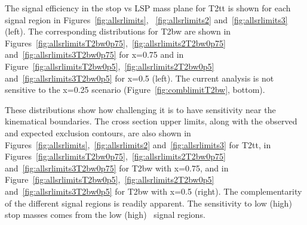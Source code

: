 
The signal efficiency in the stop vs LSP mass plane for T2tt is shown 
for each signal region in Figures~\ref{fig:allsrlimits},
~\ref{fig:allsrlimits2} and~\ref{fig:allsrlimits3} (left). The
corresponding distributions for T2bw are shown in 
Figures~\ref{fig:allsrlimitsT2bw0p75},~\ref{fig:allsrlimits2T2bw0p75}
and~\ref{fig:allsrlimits3T2bw0p75} for x=0.75 and in Figure~\ref{fig:allsrlimitsT2bw0p5},~\ref{fig:allsrlimits2T2bw0p5} and~\ref{fig:allsrlimits3T2bw0p5}
for x=0.5 (left). The current analysis is not sensitive to the x=0.25
scenario (Figure~\ref{fig:comblimitT2bw}, bottom).

These distributions show how
challenging it is to have sensitivity near the kinematical boundaries.
The cross section upper limits, along with the
observed and expected exclusion contours, are also shown in
Figures~\ref{fig:allsrlimits},~\ref{fig:allsrlimits2}
and~\ref{fig:allsrlimits3} for T2tt, in Figures~\ref{fig:allsrlimitsT2bw0p75},~\ref{fig:allsrlimits2T2bw0p75} and~\ref{fig:allsrlimits3T2bw0p75}
for T2bw with x=0.75, and in Figure~\ref{fig:allsrlimitsT2bw0p5},~\ref{fig:allsrlimits2T2bw0p5} and~\ref{fig:allsrlimits3T2bw0p5}
for T2bw with x=0.5 (right).
The complementarity of the different signal regions is readily apparent.  
The sensitivity to low (high) stop masses comes from the 
low (high) \met\ signal regions.


